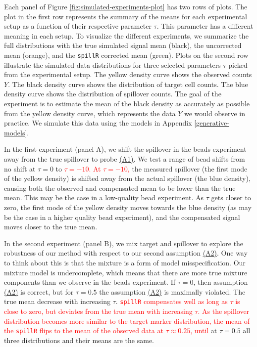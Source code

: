 \documentclass[
]{article}
\begin{document}
Each panel of Figure \ref{fig:simulated-experiments-plot} has two rows of plots. The plot in the first row represents the summary of the means for each experimental setup as a function of their respective parameter \(\tau\). This parameter has a different meaning in each setup. To visualize the different experiments, we summarize the full distributions with the true simulated signal mean (black), the uncorrected mean (orange), and the \texttt{spillR} corrected mean (green). Plots on the second row illustrate the simulated data distributions for three selected parameters \(\tau\) picked from the experimental setup. The yellow density curve shows the observed counts \(Y\). The black density curve shows the distribution of target cell counts. The blue density curve shows the distribution of spillover counts. The goal of the experiment is to estimate the mean of the black density as accurately as possible from the yellow density curve, which represents the data \(Y\) we would observe in practice. We simulate this data using the models in Appendix \ref{generative-models}.

In the first experiment (panel A), we shift the spillover in the beads experiment away from the true spillover to probe \hyperref[assumption1]{(A1)}. We test a range of bead shifts from no shift at \(\tau = 0\) to \textcolor{red}{$\tau = -10$. At $\tau = -10$,} the measured spillover (the first mode of the yellow density) is shifted away from the actual spillover (the blue density), causing both the observed and compensated mean to be lower than the true mean. This may be the case in a low-quality bead experiment. As \(\tau\) gets closer to zero, the first mode of the yellow density moves towards the blue density (as may be the case in a higher quality bead experiment), and the compensated signal moves closer to the true mean.

In the second experiment (panel B), we mix target and spillover to explore the robustness of our method with respect to our second assumption \hyperref[assumption2]{(A2)}. One way to think about this is that the mixture is a form of model misspecification. Our mixture model is undercomplete, which means that there are more true mixture components than we observe in the beads experiment. If \(\tau = 0\), then assumption \hyperref[assumption2]{(A2)} is correct, but for \(\tau = 0.5\) the assumption \hyperref[assumption2]{(A2)} is maximally violated. The true mean decrease with increasing \(\tau\).
\textcolor{red}{\texttt{spillR} compensates well as long as $\tau$ is close to zero, but deviates from the true mean with increasing $\tau$. As the spillover distribution becomes more similar to the target marker distribution, the mean of the \texttt{spillR} flips to the mean of the observed data at $\tau \approx 0.25$, until}
at \(\tau = 0.5\) all three distributions and their means are the same.
\end{document}
